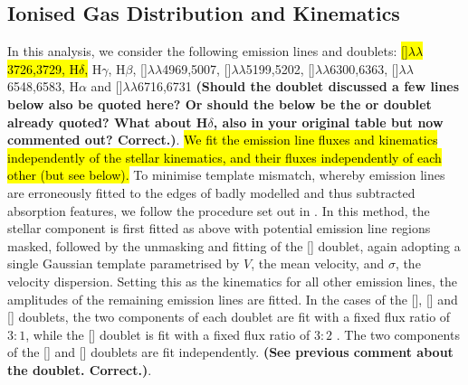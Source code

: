 \documentclass[a4paper,fleqn,usenatbib]{mnras}
\DeclareRobustCommand{\removed}[1]{{\sethlcolor{red}\hl{#1}}}
\DeclareRobustCommand{\added}[1]{{\sethlcolor{green}\hl{#1}}}
\begin{document}
\subsection{Ionised Gas Distribution and Kinematics}
\label{subsec:EmissionLines}

In this analysis, we consider the following emission lines and
doublets: 
\added{[]$\lambda\lambda$3726,3729,
H$\delta$,} H$\gamma$, H$\beta$,
[]$\lambda\lambda$4969,5007,
[]$\lambda\lambda$5199,5202,
[]$\lambda\lambda$6300,6363,
[]$\lambda\lambda$6548,6583, H$\alpha$ and
[]$\lambda\lambda$6716,6731 {\bf (Should the 
  doublet discussed a few lines below also be quoted here? Or should
  the below be the  or  doublet already quoted?
  What about H$\delta$, also in your original table but now commented
  out? Correct.)}. \removed{We fit the emission line fluxes and kinematics
independently of the stellar kinematics, and their fluxes
independently of each other (but see below).} To minimise template 
mismatch, whereby emission lines are erroneously fitted
to the edges of badly modelled and thus subtracted absorption features,
we follow the procedure set out in \citet{Sarzi2005}. In this method,
the stellar component is first fitted as above with potential emission
line regions masked, followed by the unmasking and fitting of the
[] doublet, again adopting a single
Gaussian template parametrised by $V$, the mean velocity, and
$\sigma$, the velocity dispersion. Setting this as the kinematics for 
all other emission lines, the amplitudes of the remaining
emission lines are fitted. In the cases of the [], [] 
and [] doublets, the two components of each doublet are fit 
with a fixed flux ratio of $3:1$, while the [] doublet is 
fit with a fixed flux ratio of $3:2$ \citep{Safier1992}. The two 
components of the [] and [] doublets are fit 
independently. {\bf (See previous comment about the  doublet. 
Correct.)}.
\end{document}
